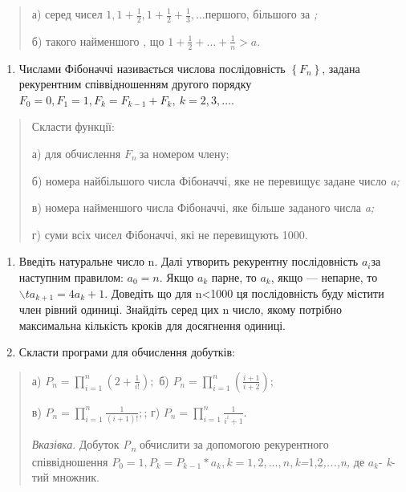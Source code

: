 \documentclass[]{article}
\begin{document}
\begin{quote}
а) серед чисел
\(1,1 + \frac{1}{2},1 + \frac{1}{2} + \frac{1}{3},\ldots\)першого,
більшого за \emph{;}

б) такого найменшого , що
\(1 + \frac{1}{2} + \ldots + \frac{1}{n} > a.\)
\end{quote}

\begin{enumerate}
\def\labelenumi{\arabic{enumi})}
\item
  Числами Фібоначчі називається числова послідовність
  \(\left\{ F_{n} \right\}\), задана рекурентним співвідношенням другого
  порядку
  \(F_{0} = 0,F_{1} = 1,F_{k} = F_{k - 1} + F_{k},\ k = 2,3,\ldots\).
\end{enumerate}

\begin{quote}
Скласти функції:

а) для обчислення \(F_{n}\ \)за номером члену;

б) номера найбільшого числа Фібоначчі, яке не перевищує задане число
\emph{a;}

в) номера найменшого числа Фібоначчі, яке більше заданого числа
\emph{a;}

г) суми всіх чисел Фібоначчі, які не перевищують 1000.
\end{quote}

\begin{enumerate}
\def\labelenumi{\arabic{enumi})}
\item
  Введіть натуральне число n. Далі утворить рекурентну послідовність
  \(a_{i}\)за наступним правилом: \(a_{0} = n\). Якщо \(a_{k}\) парне,
  то \(a_{k}\), якщо --- непарне,
  то\(\backslash ta_{k + 1} = 4a_{k} + 1\). Доведіть що для
  n\textless{}1000 ця послідовність буду містити член рівний одиниці.
  Знайдіть серед цих n число, якому потрібно максимальна кількість
  кроків для досягнення одиниці.
\item
  Скласти програми для обчислення добутків:
\end{enumerate}

\begin{quote}
а) \(P_{n} = \prod_{i = 1}^{n}\left( 2 + \frac{1}{i!} \right);\) б)
\(P_{n} = \prod_{i = 1}^{n}\left( \frac{i + 1}{i + 2} \right);\)

в) \(P_{n} = \prod_{i = 1}^{n}\frac{1}{(i + 1)!};\); г)
\(P_{n} = \prod_{i = 1}^{n}\frac{1}{i^{i} + 1}.\)

\emph{\emph{Вказівка}}. Добуток \emph{P\textsubscript{n}} обчислити за
допомогою рекурентного співвідношення
\(P_{0} = 1,P_{k} = P_{k - 1}*a_{k},k = 1,2,\ldots,n,\)\emph{k=}1,2\emph{,...,n,}
де \(a_{k}\)- \emph{k}- тий множник.
\end{quote}
\end{document}
